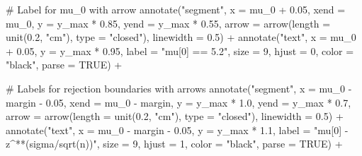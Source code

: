 \documentclass[
  letterpaper,
  DIV=11,
  numbers=noendperiod]{scrreprt}
\newenvironment{Shaded}{\begin{snugshade}}{\end{snugshade}}
\newcommand{\AttributeTok}[1]{\textcolor[rgb]{0.40,0.45,0.13}{#1}}
\newcommand{\CommentTok}[1]{\textcolor[rgb]{0.37,0.37,0.37}{#1}}
\newcommand{\ConstantTok}[1]{\textcolor[rgb]{0.56,0.35,0.01}{#1}}
\newcommand{\DecValTok}[1]{\textcolor[rgb]{0.68,0.00,0.00}{#1}}
\newcommand{\FloatTok}[1]{\textcolor[rgb]{0.68,0.00,0.00}{#1}}
\newcommand{\FunctionTok}[1]{\textcolor[rgb]{0.28,0.35,0.67}{#1}}
\newcommand{\NormalTok}[1]{\textcolor[rgb]{0.00,0.23,0.31}{#1}}
\newcommand{\SpecialCharTok}[1]{\textcolor[rgb]{0.37,0.37,0.37}{#1}}
\newcommand{\StringTok}[1]{\textcolor[rgb]{0.13,0.47,0.30}{#1}}
\begin{document}
\begin{Shaded}
\begin{Highlighting}[]
  \CommentTok{\# Label for mu\_0 with arrow}
  \FunctionTok{annotate}\NormalTok{(}\StringTok{"segment"}\NormalTok{, }\AttributeTok{x =}\NormalTok{ mu\_0 }\SpecialCharTok{+} \FloatTok{0.05}\NormalTok{, }\AttributeTok{xend =}\NormalTok{ mu\_0, }
           \AttributeTok{y =}\NormalTok{ y\_max }\SpecialCharTok{*} \FloatTok{0.85}\NormalTok{, }\AttributeTok{yend =}\NormalTok{ y\_max }\SpecialCharTok{*} \FloatTok{0.55}\NormalTok{,}
           \AttributeTok{arrow =} \FunctionTok{arrow}\NormalTok{(}\AttributeTok{length =} \FunctionTok{unit}\NormalTok{(}\FloatTok{0.2}\NormalTok{, }\StringTok{"cm"}\NormalTok{), }\AttributeTok{type =} \StringTok{"closed"}\NormalTok{),}
           \AttributeTok{linewidth =} \FloatTok{0.5}\NormalTok{) }\SpecialCharTok{+}
  \FunctionTok{annotate}\NormalTok{(}\StringTok{"text"}\NormalTok{, }\AttributeTok{x =}\NormalTok{ mu\_0 }\SpecialCharTok{+} \FloatTok{0.05}\NormalTok{, }\AttributeTok{y =}\NormalTok{ y\_max }\SpecialCharTok{*} \FloatTok{0.95}\NormalTok{, }
           \AttributeTok{label =} \StringTok{"mu[0] == 5.2"}\NormalTok{,}
           \AttributeTok{size =} \DecValTok{9}\NormalTok{, }\AttributeTok{hjust =} \DecValTok{0}\NormalTok{, }\AttributeTok{color =} \StringTok{"black"}\NormalTok{, }\AttributeTok{parse =} \ConstantTok{TRUE}\NormalTok{) }\SpecialCharTok{+}
  
  \CommentTok{\# Labels for rejection boundaries with arrows}
  \FunctionTok{annotate}\NormalTok{(}\StringTok{"segment"}\NormalTok{, }\AttributeTok{x =}\NormalTok{ mu\_0 }\SpecialCharTok{{-}}\NormalTok{ margin }\SpecialCharTok{{-}} \FloatTok{0.05}\NormalTok{, }\AttributeTok{xend =}\NormalTok{ mu\_0 }\SpecialCharTok{{-}}\NormalTok{ margin, }
           \AttributeTok{y =}\NormalTok{ y\_max }\SpecialCharTok{*} \FloatTok{1.0}\NormalTok{, }\AttributeTok{yend =}\NormalTok{ y\_max }\SpecialCharTok{*} \FloatTok{0.7}\NormalTok{,}
           \AttributeTok{arrow =} \FunctionTok{arrow}\NormalTok{(}\AttributeTok{length =} \FunctionTok{unit}\NormalTok{(}\FloatTok{0.2}\NormalTok{, }\StringTok{"cm"}\NormalTok{), }\AttributeTok{type =} \StringTok{"closed"}\NormalTok{),}
           \AttributeTok{linewidth =} \FloatTok{0.5}\NormalTok{) }\SpecialCharTok{+}
  \FunctionTok{annotate}\NormalTok{(}\StringTok{"text"}\NormalTok{, }\AttributeTok{x =}\NormalTok{ mu\_0 }\SpecialCharTok{{-}}\NormalTok{ margin }\SpecialCharTok{{-}} \FloatTok{0.05}\NormalTok{, }\AttributeTok{y =}\NormalTok{ y\_max }\SpecialCharTok{*} \FloatTok{1.1}\NormalTok{, }
           \AttributeTok{label =} \StringTok{"mu[0] {-} z\^{}\textquotesingle{}*\textquotesingle{}*(sigma/sqrt(n))"}\NormalTok{,}
           \AttributeTok{size =} \DecValTok{9}\NormalTok{, }\AttributeTok{hjust =} \DecValTok{1}\NormalTok{, }\AttributeTok{color =} \StringTok{"black"}\NormalTok{, }\AttributeTok{parse =} \ConstantTok{TRUE}\NormalTok{) }\SpecialCharTok{+}
  

\end{Highlighting}
\end{Shaded}
\end{document}
